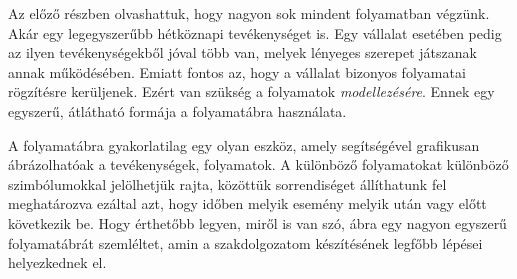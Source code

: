 


Az előző részben olvashattuk, hogy nagyon sok mindent folyamatban végzünk. Akár egy legegyszerűbb hétköznapi tevékenységet is. Egy vállalat esetében pedig az ilyen tevékenységekből jóval több van, melyek lényeges szerepet játszanak annak működésében. Emiatt fontos az, hogy a vállalat bizonyos folyamatai rögzítésre kerüljenek. Ezért van szükség a folyamatok \textit{modellezésére}. Ennek egy egyszerű, átlátható formája a folyamatábra használata.



A folyamatábra gyakorlatilag egy olyan eszköz, amely segítségével grafikusan ábrázolhatóak a tevékenységek, folyamatok. A különböző folyamatokat különböző szimbólumokkal jelölhetjük rajta, közöttük sorrendiséget állíthatunk fel meghatározva ezáltal azt, hogy időben melyik esemény melyik után vagy előtt következik be. Hogy érthetőbb legyen, miről is van szó,  ábra egy nagyon egyszerű folyamatábrát szemléltet, amin a szakdolgozatom készítésének legfőbb lépései helyezkednek el.

